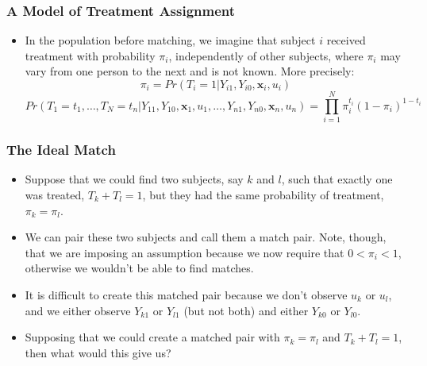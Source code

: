 \documentclass{beamer}
\begin{document}
\begin{frame}[c]\frametitle{A Model of Treatment Assignment}
	\begin{itemize}
		\item<+-> In the population before matching, we imagine that subject $i$ received treatment with probability $\pi_i$, independently of other subjects, where $\pi_i$ may vary from one person to the next and is not known.  More precisely:
		\[ \pi_i = Pr(T_i = 1 | Y_{i1}, Y_{i0}, \mathbf{x}_i, u_i) \]
		\[ Pr(T_1 = t_1, \dots, T_N = t_n | Y_{11}, Y_{10}, \mathbf{x}_1, u_1, \dots, Y_{n1}, Y_{n0}, \mathbf{x}_n, u_n) = \prod_{i = 1}^N \pi_i^{t_i} (1 - \pi_i)^{1 - t_i} \]
	\end{itemize}
\end{frame}

\begin{frame}[c]\frametitle{The Ideal Match}
	\begin{itemize}
		\item<+-> Suppose that we could find two subjects, say $k$ and $l$, such that exactly one was treated, $T_k + T_l = 1$, but they had the same probability of treatment, $\pi_k = \pi_l$. 
		\item<+-> We can pair these two subjects and call them a match pair.  Note, though, that we are imposing an assumption because we now require that $0 < \pi_i < 1$, otherwise we wouldn't be able to find matches.
		\item<+-> It is difficult to create this matched pair because we don't observe $u_k$ or $u_l$, and we either observe $Y_{k1}$ or $Y_{l1}$ (but not both) and either $Y_{k0}$ or $Y_{l0}$.
		\item<+-> Supposing that we could create a matched pair with $\pi_k = \pi_l$ and $T_k + T_l = 1$, then what would this give us?
	\end{itemize}
\end{frame}
\end{document}
